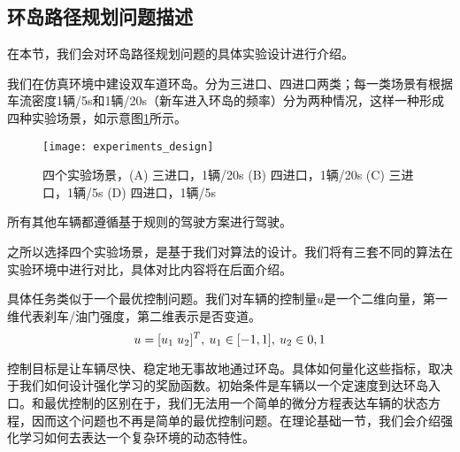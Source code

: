 \subsection{环岛路径规划问题描述}
在本节，我们会对环岛路径规划问题的具体实验设计进行介绍。\par
我们在仿真环境中建设双车道环岛。分为三进口、四进口两类；每一类场景有根据车流密度1辆/5s和1辆/20s（新车进入环岛的频率）分为两种情况，这样一种形成四种实验场景，如示意图\ref{fig:experiments}所示。
      \begin{figure}[H] %
        \centering
        \texttt{[image: experiments\_design]}
        \caption{四个实验场景，(A) 三进口，1辆/20s (B) 四进口，1辆/20s (C) 三进口，1辆/5s (D) 四进口，1辆/5s}
        \label{fig:experiments}
      \end{figure}
    \par 所有其他车辆都遵循基于规则的驾驶方案进行驾驶。
    \par 之所以选择四个实验场景，是基于我们对算法的设计。我们将有三套不同的算法在实验环境中进行对比，具体对比内容将在后面介绍。
    \par 具体任务类似于一个最优控制问题。我们对车辆的控制量$u$是一个二维向量，第一维代表刹车/油门强度，第二维表示是否变道。
    $$ u = [u_1\; u_2]^T,\: \space u_1 \in [-1, 1],\: \space u_2 \in {0, 1} $$
    \par 控制目标是让车辆尽快、稳定地无事故地通过环岛。具体如何量化这些指标，取决于我们如何设计强化学习的奖励函数。初始条件是车辆以一个定速度到达环岛入口。和最优控制的区别在于，我们无法用一个简单的微分方程表达车辆的状态方程，因而这个问题也不再是简单的最优控制问题。在理论基础一节，我们会介绍强化学习如何去表达一个复杂环境的动态特性。

